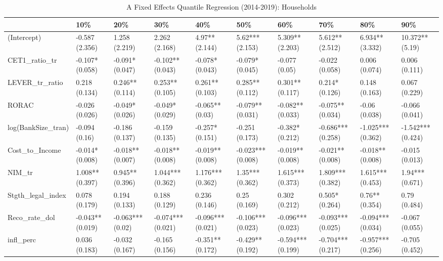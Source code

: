 \begin{table}[ht]
\centering
\caption{A Fixed Effects Quantile Regression (2014-2019): Households} 
\begingroup\small
\begin{tabular}{llllllllll}
  \toprule
 & 10\% & 20\% & 30\% & 40\% & 50\% & 60\% & 70\% & 80\% & 90\% \\ 
  \midrule
(Intercept) & -0.587 (2.356) & 1.258 (2.219) & 2.262 (2.168) & 4.97** (2.144) & 5.62*** (2.153) & 5.309** (2.203) & 5.612** (2.512) & 6.934** (3.332) & 10.372** (5.19) \\ 
  CET1\_ratio\_tr & -0.107* (0.058) & -0.091* (0.047) & -0.102** (0.043) & -0.078* (0.043) & -0.079* (0.045) & -0.077 (0.05) & -0.022 (0.058) & 0.006 (0.074) & 0.006 (0.111) \\ 
  LEVER\_tr\_ratio & 0.218 (0.134) & 0.246** (0.114) & 0.253** (0.105) & 0.261** (0.103) & 0.285** (0.112) & 0.301** (0.117) & 0.214* (0.126) & 0.148 (0.163) & 0.067 (0.229) \\ 
  RORAC & -0.026 (0.026) & -0.049* (0.026) & -0.049* (0.029) & -0.065** (0.03) & -0.079** (0.031) & -0.082** (0.033) & -0.075** (0.034) & -0.06 (0.038) & -0.066 (0.041) \\ 
  log(BankSize\_tran) & -0.094 (0.16) & -0.186 (0.137) & -0.159 (0.135) & -0.257* (0.151) & -0.251 (0.173) & -0.382* (0.212) & -0.686*** (0.258) & -1.025*** (0.362) & -1.542*** (0.424) \\ 
  Cost\_to\_Income & -0.014* (0.008) & -0.018** (0.007) & -0.018** (0.008) & -0.019** (0.008) & -0.023*** (0.008) & -0.019** (0.008) & -0.021** (0.008) & -0.018** (0.008) & -0.015 (0.013) \\ 
  NIM\_tr & 1.008** (0.397) & 0.945** (0.396) & 1.044*** (0.362) & 1.176*** (0.362) & 1.35*** (0.362) & 1.615*** (0.373) & 1.809*** (0.382) & 1.615*** (0.453) & 1.94*** (0.671) \\ 
  Stgth\_legal\_index & 0.078 (0.179) & 0.194 (0.133) & 0.188 (0.129) & 0.236 (0.146) & 0.25 (0.169) & 0.302 (0.212) & 0.505* (0.264) & 0.76** (0.354) & 0.79 (0.484) \\ 
  Reco\_rate\_dol & -0.043** (0.019) & -0.063*** (0.02) & -0.074*** (0.021) & -0.096*** (0.021) & -0.106*** (0.023) & -0.096*** (0.023) & -0.093*** (0.025) & -0.094*** (0.034) & -0.067 (0.055) \\ 
  infl\_perc & 0.036 (0.183) & -0.032 (0.167) & -0.165 (0.156) & -0.351** (0.172) & -0.429** (0.192) & -0.594*** (0.199) & -0.704*** (0.217) & -0.957*** (0.256) & -0.705 (0.452) \\ 

\end{tabular}
\end{table}
